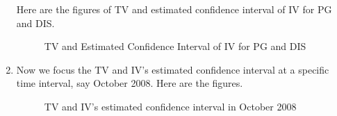 \documentclass[12pt,letterpaper]{article}
\begin{document}
\begin{enumerate}[label=\textbf{(\Alph*)}]
Here are the figures of TV and estimated confidence interval of IV for PG and DIS.

 \begin{figure}[H]
            \centering
            \caption{TV and Estimated Confidence Interval of IV for PG and DIS}
\end{figure}
\item 
Now we focus the TV and IV's estimated confidence interval at a specific time interval, say October 2008. Here are the figures.
 \begin{figure}[H]
            \centering
            \caption{TV and IV's estimated confidence interval in October 2008}
\end{figure}


\end{enumerate}
\end{document}
